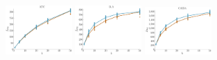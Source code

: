 \documentclass[a4paper]{report}
\newcommand{\wratio}{0.19}
\begin{document}
\includegraphics[width=\wratio\textwidth]{maxcut/ATC/fs_atc}\hfill
\includegraphics[width=\wratio\textwidth]{maxcut/B_A/fs_b_a}\hfill
\includegraphics[width=\wratio\textwidth]{maxcut/CAIDA/fs_caida}\hfill
\end{document}
